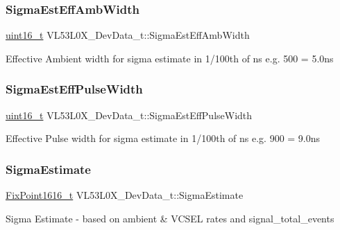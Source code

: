 \subsubsection{\texorpdfstring{Sigma\+Est\+Eff\+Amb\+Width}{SigmaEstEffAmbWidth}}
{\footnotesize\ttfamily \hyperlink{vl53l0x__types_8h_a273cf69d639a59973b6019625df33e30}{uint16\+\_\+t} V\+L53\+L0\+X\+\_\+\+Dev\+Data\+\_\+t\+::\+Sigma\+Est\+Eff\+Amb\+Width}

Effective Ambient width for sigma estimate in 1/100th of ns e.\+g. 500 = 5.\+0ns \mbox{\label{structVL53L0X__DevData__t_ab0f319430e08b3362daa62749de409ac}} 
\subsubsection{\texorpdfstring{Sigma\+Est\+Eff\+Pulse\+Width}{SigmaEstEffPulseWidth}}
{\footnotesize\ttfamily \hyperlink{vl53l0x__types_8h_a273cf69d639a59973b6019625df33e30}{uint16\+\_\+t} V\+L53\+L0\+X\+\_\+\+Dev\+Data\+\_\+t\+::\+Sigma\+Est\+Eff\+Pulse\+Width}

Effective Pulse width for sigma estimate in 1/100th of ns e.\+g. 900 = 9.\+0ns \mbox{\label{structVL53L0X__DevData__t_a6a7882154860331aa2cde829124a1b28}} 
\subsubsection{\texorpdfstring{Sigma\+Estimate}{SigmaEstimate}}
{\footnotesize\ttfamily \hyperlink{vl53l0x__types_8h_afb910790161809fc76e1a274a6349384}{Fix\+Point1616\+\_\+t} V\+L53\+L0\+X\+\_\+\+Dev\+Data\+\_\+t\+::\+Sigma\+Estimate}

Sigma Estimate -\/ based on ambient \& V\+C\+S\+EL rates and signal\+\_\+total\+\_\+events \mbox{\label{structVL53L0X__DevData__t_a88d3c2b890dd076df712c173c608c27d}} 
